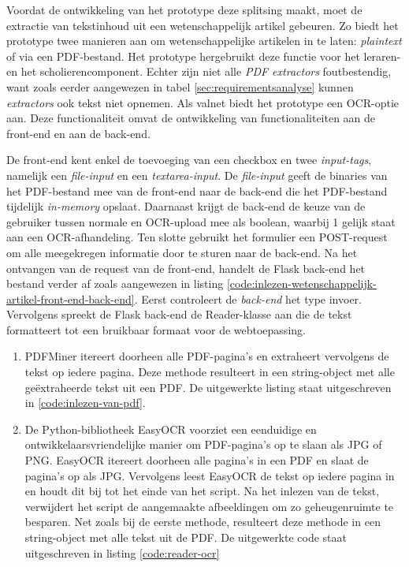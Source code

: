 \medspace

Voordat de ontwikkeling van het prototype deze splitsing maakt, moet de extractie van tekstinhoud uit een wetenschappelijk artikel gebeuren. Zo biedt het prototype twee manieren aan om wetenschappelijke artikelen in te laten: \textit{plaintext} of via een PDF-bestand. Het prototype hergebruikt deze functie voor het leraren- en het scholierencomponent. Echter zijn niet alle \textit{PDF extractors} foutbestendig, want zoals eerder aangewezen in tabel \ref{sec:requirementsanalyse} kunnen \textit{extractors} ook tekst niet opnemen. Als valnet biedt het prototype een OCR-optie aan. Deze functionaliteit omvat de ontwikkeling van functionaliteiten aan de front-end en aan de back-end.

\medspace

De front-end kent enkel de toevoeging van een checkbox en twee \textit{input-tags}, namelijk een \textit{file-input} en een \textit{textarea-input}. De \textit{file-input} geeft de binaries van het PDF-bestand mee van de front-end naar de back-end die het PDF-bestand tijdelijk \textit{in-memory} opslaat. Daarnaast krijgt de back-end de keuze van de gebruiker tussen normale en OCR-upload mee als boolean, waarbij 1 gelijk staat aan een OCR-afhandeling. Ten slotte gebruikt het formulier een POST-request om alle meegekregen informatie door te sturen naar de back-end. Na het ontvangen van de request van de front-end, handelt de Flask back-end het bestand verder af zoals aangewezen in listing \ref{code:inlezen-wetenschappelijk-artikel-front-end-back-end}. Eerst controleert de \textit{back-end} het type invoer. Vervolgens spreekt de Flask back-end de Reader-klasse aan die de tekst formatteert tot een bruikbaar formaat voor de webtoepassing. 

\begin{enumerate}
	\item PDFMiner itereert doorheen alle PDF-pagina's en extraheert vervolgens de tekst op iedere pagina. Deze methode resulteert in een string-object met alle geëxtraheerde tekst uit een PDF. De uitgewerkte listing staat uitgeschreven in \ref{code:inlezen-van-pdf}.
	\item De Python-bibliotheek EasyOCR voorziet een eenduidige en ontwikkelaarsvriendelijke manier om PDF-pagina's op te slaan als JPG of PNG. EasyOCR itereert doorheen alle pagina's in een PDF en slaat de pagina's op als JPG. Vervolgens leest EasyOCR de tekst op iedere pagina in en houdt dit bij tot het einde van het script. Na het inlezen van de tekst, verwijdert het script de aangemaakte afbeeldingen om zo geheugenruimte te besparen. Net zoals bij de eerste methode, resulteert deze methode in een string-object met alle tekst uit de PDF. De uitgewerkte code staat uitgeschreven in listing \ref{code:reader-ocr}
\end{enumerate}

